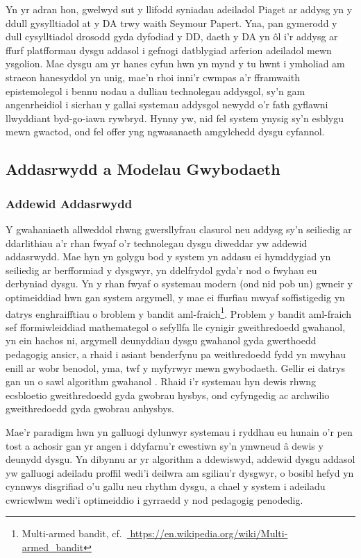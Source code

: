Yn yr adran hon, gwelwyd sut y llifodd syniadau adeiladol Piaget ar addysg yn y ddull gysylltiadol at y DA trwy waith Seymour Papert. Yna, pan gymerodd y dull cysylltiadol drosodd gyda dyfodiad y DD, daeth y DA yn ôl i'r addysg ar ffurf platfformau dysgu addasol i gefnogi datblygiad arferion adeiladol mewn ysgolion. Mae dysgu am yr hanes cyfun hwn yn mynd y tu hwnt i ymholiad am straeon hanesyddol yn unig, mae'n rhoi inni'r cwmpas a'r fframwaith epistemolegol i bennu nodau a dulliau technolegau addysgol, sy'n gam angenrheidiol i sicrhau y gallai systemau addysgol newydd o'r fath gyflawni llwyddiant byd-go-iawn rywbryd. Hynny yw, nid fel system ynysig sy'n esblygu mewn gwactod, ond fel offer yng ngwasanaeth amgylchedd dysgu cyfannol.
    
\subsection{Addasrwydd a Modelau Gwybodaeth}
\subsubsection{Addewid Addasrwydd}
Y gwahaniaeth allweddol rhwng gwersllyfrau clasurol neu addysg sy'n seiliedig ar ddarlithiau a'r rhan fwyaf o'r technolegau dysgu diweddar yw addewid addasrwydd. Mae hyn yn golygu bod y system yn addasu ei hymddygiad yn seiliedig ar berfformiad y dysgwyr, yn ddelfrydol gyda'r nod o fwyhau eu derbyniad dysgu. Yn y rhan fwyaf o systemau modern (ond nid pob un) gwneir y optimeiddiad hwn gan system argymell, y mae ei ffurfiau mwyaf soffistigedig yn datrys enghraifftiau o broblem y bandit aml-fraich\footnote{Multi-armed bandit, cf.~\href{https://en.wikipedia.org/wiki/Multi-armed_bandit}{ https://en.wikipedia.org/wiki/Multi-armed\_bandit}}.
Problem y bandit aml-fraich sef fformiwleiddiad mathemategol o sefyllfa lle cynigir gweithredoedd gwahanol, yn ein hachos ni, argymell deunyddiau dysgu gwahanol gyda gwerthoedd pedagogig ansicr, a rhaid i asiant benderfynu pa weithredoedd fydd yn mwyhau enill ar wobr benodol, yma, twf y myfyrwyr mewn gwybodaeth. Gellir ei datrys gan un o sawl algorithm gwahanol \parencite{chen_recommendation_2017}. Rhaid i'r systemau hyn dewis rhwng ecsbloetio gweithredoedd gyda gwobrau hysbys, ond cyfyngedig ac archwilio gweithredoedd gyda gwobrau anhysbys.

Mae’r paradigm hwn yn galluogi dylunwyr systemau i ryddhau eu hunain o’r pen tost a achosir gan yr angen i ddyfarnu’r cwestiwn sy’n ymwneud â dewis y deunydd dysgu. Yn dibynnu ar yr algorithm a ddewiswyd, addewid dysgu addasol yw galluogi adeiladu proffil wedi'i deilwra am sgiliau'r dysgwyr, o bosibl hefyd yn cynnwys disgrifiad o'u gallu neu rhythm dysgu, a chael y system i adeiladu cwricwlwm wedi'i optimeiddio i gyrraedd y nod pedagogig penodedig.

